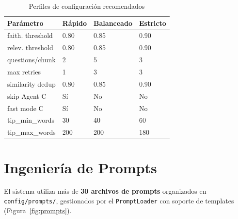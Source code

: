\documentclass[10pt,twocolumn,letterpaper]{article}
\begin{document}
\begin{table}[H]
\centering
\caption{Perfiles de configuraci\'on recomendados}
\label{tab:profiles}
\scriptsize
\begin{tabularx}{\columnwidth}{lXXX}
\toprule
\textbf{Par\'ametro} & \textbf{R\'apido} & \textbf{Balanceado} & \textbf{Estricto} \\
\midrule
faith. threshold & 0.80 & 0.85 & 0.90 \\
relev. threshold & 0.80 & 0.85 & 0.90 \\
questions/chunk & 2 & 5 & 3 \\
max retries & 1 & 3 & 3 \\
similarity dedup & 0.80 & 0.85 & 0.90 \\
skip Agent C & S\'i & No & No \\
fast mode C & S\'i & No & No \\
tip\_min\_words & 30 & 40 & 60 \\
tip\_max\_words & 200 & 200 & 180 \\
\bottomrule
\end{tabularx}
\end{table}

\section{Ingenier\'ia de Prompts}
\label{sec:prompts}

El sistema utiliza m\'as de \textbf{30 archivos de prompts} organizados en
\texttt{config/prompts/}, gestionados por el \texttt{PromptLoader} con soporte
de templates (Figura~\ref{fig:prompts}).
\end{document}

